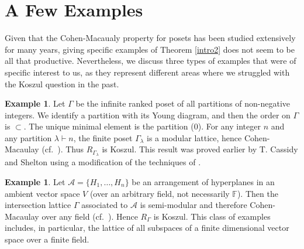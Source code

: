 \documentclass[11pt,righttag]{amsart}
\theoremstyle{definition}
\newtheorem{example}[thm]{Example}
\begin{document}
\section{A Few Examples}

Given that the Cohen-Macaualy property for posets has been studied extensively for many years, giving specific examples of 
Theorem \ref{intro2} does not seem to be all that productive.  Nevertheless, we discuss three types of examples that were of specific 
interest to us, as they represent different areas where we struggled with the Koszul question in the past. 

\begin{example}   Let $\Gamma$ be the infinite ranked poset of all partitions of non-negative integers.  We identify a partition with 
its Young diagram, and then the order on $\Gamma$ is $\subset$.  The unique minimal element is the partition (0).  For any integer 
$n$ and any partition $\lambda \vdash n$, the finite poset $\Gamma_\lambda$ is a modular lattice, hence Cohen-Macaulay 
(cf.~\cite{BGSsurvey}).  Thus $R_{\Gamma_\lambda}$ is Koszul.  This result was proved earlier by T. Cassidy and Shelton using 
a modification of  the techniques of \cite{CPS}.
\end{example}

\begin{example}  Let ${\mathcal A} = \{H_1,\ldots, H_n\}$ be an arrangement of hyperplanes in an ambient vector space $V$ 
(over an arbitrary field, not necessarily ${{\mathbb F}}$).   Then the intersection lattice $\Gamma$ associated to ${\mathcal A}$ is semi-modular and therefore Cohen-Macaulay over any field (cf.~\cite{BGSsurvey}).  Hence $R_\Gamma$ is Koszul. This class 
of examples includes, in particular, the lattice of all subspaces of a finite dimensional vector space over a finite field. 
\end{example}
\end{document}
